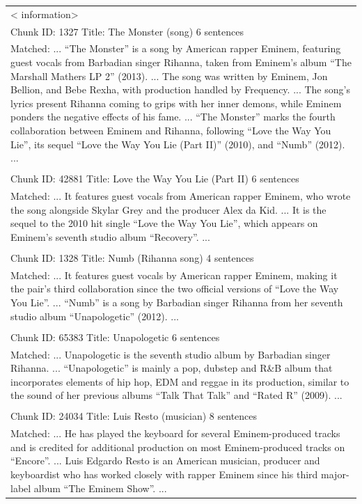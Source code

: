 \documentclass[11pt]{article}
\begin{document}
\begin{longtable}{|p{}|}
\textless{} information\textgreater{} \\
Chunk ID: 1327 \textbar{} Title: The Monster (song) \textbar{} 6 sentences \\
Matched: ... ``The Monster'' is a song by American rapper Eminem, featuring guest vocals from Barbadian singer Rihanna, taken from Eminem's album ``The Marshall Mathers LP 2'' (2013). ... The song was written by Eminem, Jon Bellion, and Bebe Rexha, with production handled by Frequency. ... The song's lyrics present Rihanna coming to grips with her inner demons, while Eminem ponders the negative effects of his fame. ... ``The Monster'' marks the fourth collaboration between Eminem and Rihanna, following ``Love the Way You Lie'', its sequel ``Love the Way You Lie (Part II)'' (2010), and ``Numb'' (2012). ... \\
\\
Chunk ID: 42881 \textbar{} Title: Love the Way You Lie (Part II) \textbar{} 6 sentences \\
Matched: ... It features guest vocals from American rapper Eminem, who wrote the song alongside Skylar Grey and the producer Alex da Kid. ... It is the sequel to the 2010 hit single ``Love the Way You Lie'', which appears on Eminem's seventh studio album ``Recovery''. ... \\
\\
Chunk ID: 1328 \textbar{} Title: Numb (Rihanna song) \textbar{} 4 sentences \\
Matched: ... It features guest vocals by American rapper Eminem, making it the pair's third collaboration since the two official versions of ``Love the Way You Lie''. ... ``Numb'' is a song by Barbadian singer Rihanna from her seventh studio album ``Unapologetic'' (2012). ... \\
\\
Chunk ID: 65383 \textbar{} Title: Unapologetic \textbar{} 6 sentences \\
Matched: ... Unapologetic is the seventh studio album by Barbadian singer Rihanna. ... ``Unapologetic'' is mainly a pop, dubstep and R\&B album that incorporates elements of hip hop, EDM and reggae in its production, similar to the sound of her previous albums ``Talk That Talk'' and ``Rated R'' (2009). ... \\
\\
Chunk ID: 24034 \textbar{} Title: Luis Resto (musician) \textbar{} 8 sentences \\
Matched: ... He has played the keyboard for several Eminem-produced tracks and is credited for additional production on most Eminem-produced tracks on ``Encore''. ... Luis Edgardo Resto is an American musician, producer and keyboardist who has worked closely with rapper Eminem since his third major-label album ``The Eminem Show''. ... \\

\end{longtable}
\end{document}
